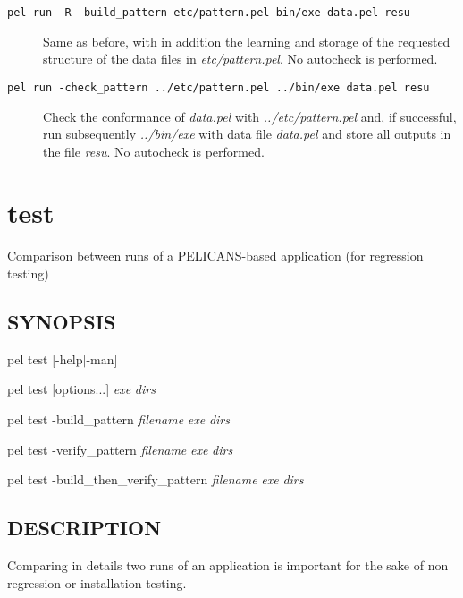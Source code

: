 \documentclass{article}
\begin{document}
\begin{description}
\item[\texttt{pel run -R -build\_pattern etc/pattern.pel bin/exe data.pel resu}] \mbox{}

Same as before, with in addition the learning and storage of the
requested structure of the data files in \emph{etc/pattern.pel}. 
No autocheck is performed.


\item[\texttt{pel run -check\_pattern ../etc/pattern.pel ../bin/exe data.pel resu}] \mbox{}

Check the conformance of \emph{data.pel} with \emph{../etc/pattern.pel}
and, if successful, run subsequently \emph{../bin/exe} with data file
\emph{data.pel} and store all outputs in the file \emph{resu}. No autocheck is
performed.

\end{description}
\clearpage
\section{test\label{test}}


Comparison between runs of a PELICANS-based application (for regression testing)

\subsection*{SYNOPSIS\label{test_SYNOPSIS}}


pel test [-help$|$-man]



pel test [options...] \emph{exe} \emph{dirs}



pel test -build\_pattern \emph{filename} \emph{exe} \emph{dirs}



pel test -verify\_pattern \emph{filename} \emph{exe} \emph{dirs}



pel test -build\_then\_verify\_pattern \emph{filename} \emph{exe} \emph{dirs}

\subsection*{DESCRIPTION\label{test_DESCRIPTION}}


Comparing in details two runs of an application is important for
the sake of non regression or installation testing.
\end{document}
